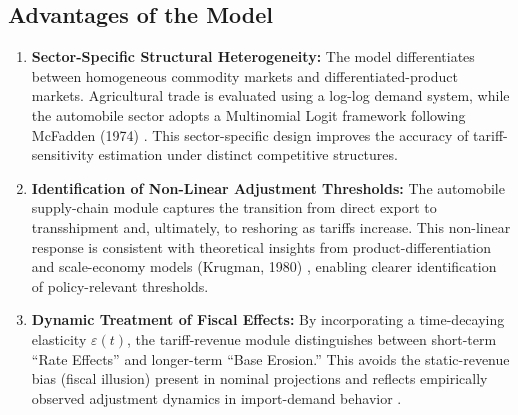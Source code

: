 \documentclass{apmcmthesis}
\begin{document}
\subsection{Advantages of the Model}
\begin{enumerate}
    \item \textbf{Sector-Specific Structural Heterogeneity:}
    The model differentiates between homogeneous commodity markets and differentiated-product markets. 
    Agricultural trade is evaluated using a log-log demand system, while the automobile sector adopts a Multinomial Logit framework 
    following McFadden (1974) \cite{McFadden1974}. 
    This sector-specific design improves the accuracy of tariff-sensitivity estimation under distinct competitive structures.

    \item \textbf{Identification of Non-Linear Adjustment Thresholds:}
    The automobile supply-chain module captures the transition from direct export to transshipment and, ultimately, to reshoring 
    as tariffs increase. 
    This non-linear response is consistent with theoretical insights from product-differentiation and scale-economy models 
    (Krugman, 1980) \cite{Krugman1980}, enabling clearer identification of policy-relevant thresholds.

    \item \textbf{Dynamic Treatment of Fiscal Effects:}
    By incorporating a time-decaying elasticity $\varepsilon(t)$, the tariff-revenue module distinguishes between short-term 
    “Rate Effects” and longer-term “Base Erosion.” 
    This avoids the static-revenue bias (fiscal illusion) present in nominal projections and reflects empirically observed 
    adjustment dynamics in import-demand behavior \cite{Krugman1980}.
\end{enumerate}
\end{document}
